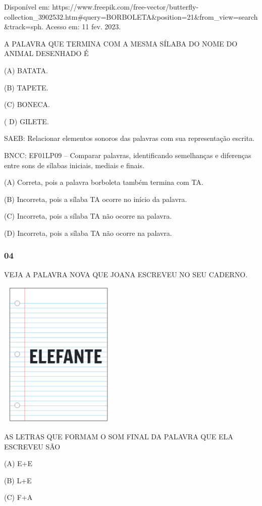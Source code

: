Disponível
em: https://www.freepik.com/free-vector/butterfly-collection\_3902532.htm\#query=BORBOLETA\&position=21\&from\_view=search\&track=sph.
Acesso em: 11 fev. 2023.

A PALAVRA QUE TERMINA COM A MESMA SÍLABA DO NOME DO ANIMAL DESENHADO É

(A) BATATA.

(B) TAPETE.

(C) BONECA.

( D) GILETE.

SAEB: Relacionar elementos sonoros das palavras com sua
representação escrita.

BNCC: EF01LP09 -- Comparar palavras, identificando semelhanças e
diferenças entre sons de sílabas iniciais, mediais e finais.

(A) Correta, pois a palavra borboleta também termina com TA.

(B) Incorreta, pois a sílaba TA ocorre no início da palavra.

(C) Incorreta, pois a sílaba TA não ocorre na palavra.

(D) Incorreta, pois a sílaba TA não ocorre na palavra.

\subsubsection{04}\label{section-60}

VEJA A PALAVRA NOVA QUE JOANA ESCREVEU NO SEU CADERNO.

\includegraphics[width=2.24931in,height=2.80435in]{media/image230.png}

AS LETRAS QUE FORMAM O SOM FINAL DA PALAVRA QUE ELA ESCREVEU SÃO

(A) E+E

(B) L+E

(C) F+A

